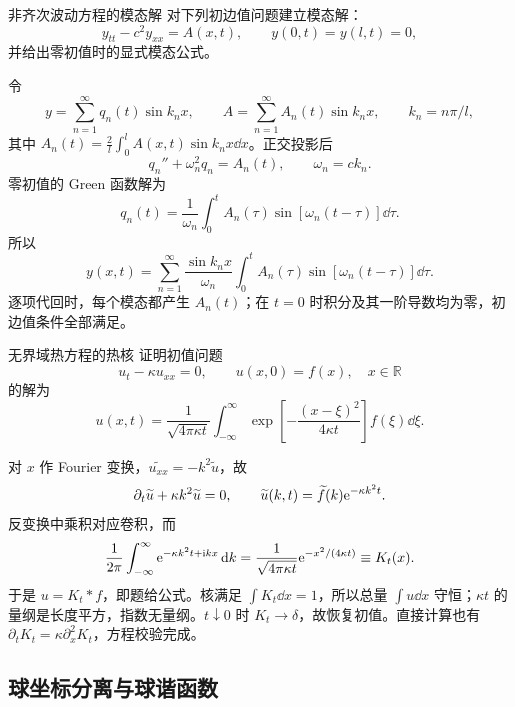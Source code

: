 \begin{advexamplebox}{非齐次波动方程的模态解}\label{advA3:ex:forced-wave}
对下列初边值问题建立模态解：
\[
 y_{tt}-c^2y_{xx}=A(x,t),\qquad y(0,t)=y(l,t)=0,
\]
并给出零初值时的显式模态公式。

\AQForcedWave
\end{advexamplebox}
\begin{advsolution}
\AAForcedWave

令
\[
 y=\sum_{n=1}^\infty q_n(t)\sin k_nx,\qquad
 A=\sum_{n=1}^\infty A_n(t)\sin k_nx,\qquad k_n=n\pi/l,
\]
其中
$A_n(t)=\tfrac2l\int_0^lA(x,t)\sin k_nx\dd x$。正交投影后
\[
 q_n''+\omega_n^2q_n=A_n(t),\qquad \omega_n=ck_n.
\]
零初值的 Green 函数解为
\[
 \boxed{q_n(t)=\frac1{\omega_n}\int_0^t
 A_n(\tau)\sin[\omega_n(t-\tau)]\dd\tau}.
\]
所以
\[
 y(x,t)=\sum_{n=1}^\infty\frac{\sin k_nx}{\omega_n}
 \int_0^tA_n(\tau)\sin[\omega_n(t-\tau)]\dd\tau.
\]
逐项代回时，每个模态都产生 $A_n(t)$；在 $t=0$ 时积分及其一阶导数均为零，初边值条件全部满足。
\end{advsolution}

\begin{advexamplebox}{无界域热方程的热核}\label{advA3:ex:heat-kernel}
证明初值问题
\[
 u_t-\kappa u_{xx}=0,\qquad u(x,0)=f(x),\quad x\in\mathbb R
\]
的解为
\[
 u(x,t)=\frac1{\sqrt{4\pi\kappa t}}
 \int_{-\infty}^{\infty}
 \exp\!\left[-\frac{(x-\xi)^2}{4\kappa t}\right]f(\xi)\dd\xi.
\]

\AQHeatKernel
\end{advexamplebox}
\begin{advsolution}
\AAHeatKernel

对 $x$ 作 Fourier 变换，$\widetilde{u_{xx}}=-k^2\widetilde u$，故
\[
 \partial_t\widetilde u+\kappa k^2\widetilde u=0,\qquad
 \widetilde u(k,t)=\widetilde f(k)\mathrm e^{-\kappa k^2t}.
\]
反变换中乘积对应卷积，而
\[
 \frac1{2\pi}\int_{-\infty}^{\infty}
 \mathrm e^{-\kappa k^2t+\mathrm i kx}\mathop{}\!\mathrm d k
 =\frac1{\sqrt{4\pi\kappa t}}\mathrm e^{-x^2/(4\kappa t)}
 \equiv K_t(x).
\]
于是 $u=K_t*f$，即题给公式。核满足
$\int K_t\dd x=1$，所以总量 $\int u\dd x$ 守恒；$\kappa t$ 的量纲是长度平方，指数无量纲。$t\downarrow0$ 时 $K_t\to\delta$，故恢复初值。直接计算也有 $\partial_tK_t=\kappa\partial_x^2K_t$，方程校验完成。
\end{advsolution}

\subsection{球坐标分离与球谐函数}

